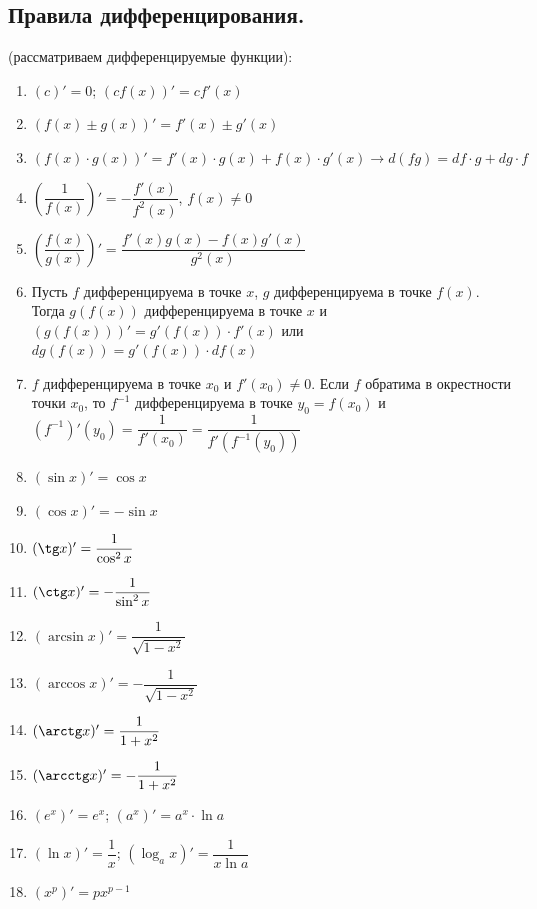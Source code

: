 \documentclass[12pt]{article}
\begin{document}
	\subsection{Правила дифференцирования.}
	(рассматриваем дифференцируемые функции):
	\begin{enumerate}
		\item $(c)' = 0$; $(cf(x))' = cf'(x)$
		\item $(f(x) \pm g(x))' = f'(x) \pm g'(x)$
		\item $(f(x) \cdot g(x))' = f'(x) \cdot g(x) + f(x) \cdot g'(x) \rightarrow d(fg) = df \cdot g + dg \cdot f$
		\item $\left( \dfrac{1}{f(x)} \right)' = - \dfrac{f'(x)}{f^2(x)}$, $f(x) \not= 0$
		\item $\left( \dfrac{f(x)}{g(x)} \right)' = \dfrac{f'(x)g(x) - f(x)g'(x)}{g^2(x)}$
		\item Пусть $f$ дифференцируема в точке $x$, $g$ дифференцируема в точке $f(x)$. Тогда $g(f(x))$ дифференцируема в точке $x$ и $(g(f(x)))' = g'(f(x)) \cdot f'(x)$ или $dg(f(x)) = g'(f(x)) \cdot df(x)$
		\item $f$ дифференцируема в точке $x_0$ и $f'(x_0) \not= 0$. Если $f$ обратима в окрестности точки $x_0$, то $f^{-1}$ дифференцируема в точке $y_0 = f(x_0)$ и $(f^{-1})'(y_0) = \dfrac{1}{f'(x_0)} = \dfrac{1}{f'(f^{-1}(y_0))}$
		\item $(\sin x)' = \cos x$
		\item $(\cos x)' = - \sin x$
		\item $(\tg x)' = \dfrac{1}{\cos^2 x}$
		\item $(\ctg x)' = - \dfrac{1}{\sin^2 x}$
		\item $(\arcsin x)' = \dfrac{1}{\sqrt{1 - x^2}}$
		\item $(\arccos x)' = - \dfrac{1}{\sqrt{1 - x^2}}$
		\item $(\arctg x)' = \dfrac{1}{1 + x^2}$
		\item $(\arcctg x)' = - \dfrac{1}{1 + x^2}$
		\item $(e^x)' = e^x$; $(a^x)' = a^x \cdot \ln a$
		\item $(\ln x)' = \dfrac{1}{x}$; $(\log_ax)' = \dfrac{1}{x \ln a}$
		\item $(x^p)' = px^{p - 1}$
	\end{enumerate}
\end{document}
